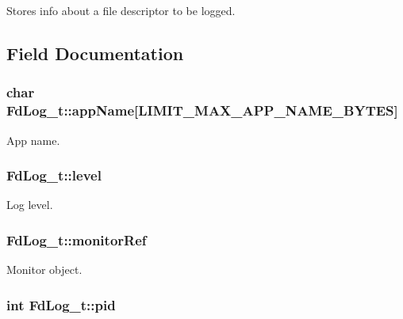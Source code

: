 Stores info about a file descriptor to be logged. 

\subsection{Field Documentation}
\subsubsection[{\texorpdfstring{app\+Name}{appName}}]{\setlength{\rightskip}{0pt plus 5cm}char Fd\+Log\+\_\+t\+::app\+Name\mbox{[}{\bf L\+I\+M\+I\+T\+\_\+\+M\+A\+X\+\_\+\+A\+P\+P\+\_\+\+N\+A\+M\+E\+\_\+\+B\+Y\+T\+ES}\mbox{]}}\hypertarget{struct_fd_log__t_a0fb4fb5c558f6e56e211f72d57bcf7a3}{}\label{struct_fd_log__t_a0fb4fb5c558f6e56e211f72d57bcf7a3}


App name. 

\subsubsection[{\texorpdfstring{level}{level}}]{ Fd\+Log\+\_\+t\+::level}\hypertarget{struct_fd_log__t_a47ae3d2c090271a58648ca9a4929f5f1}{}\label{struct_fd_log__t_a47ae3d2c090271a58648ca9a4929f5f1}


Log level. 

\subsubsection[{\texorpdfstring{monitor\+Ref}{monitorRef}}]{ Fd\+Log\+\_\+t\+::monitor\+Ref}\hypertarget{struct_fd_log__t_ad5a05e11ca8de3c19f5ff7dc6b59f33f}{}\label{struct_fd_log__t_ad5a05e11ca8de3c19f5ff7dc6b59f33f}


Monitor object. 

\subsubsection[{\texorpdfstring{pid}{pid}}]{\setlength{\rightskip}{0pt plus 5cm}int Fd\+Log\+\_\+t\+::pid}\hypertarget{struct_fd_log__t_ab8ab190f1dea284f27dca4b9976fbf21}{}\label{struct_fd_log__t_ab8ab190f1dea284f27dca4b9976fbf21}


